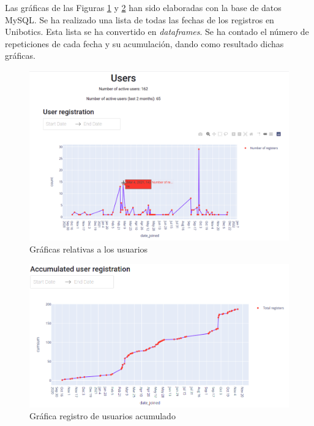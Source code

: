 Las gráficas de las Figuras \ref{fig:users} y \ref{fig:accumulated} han sido elaboradas con la base de datos MySQL. Se ha realizado una lista de todas las fechas de los registros en Unibotics. Esta lista se ha convertido en \textit{dataframes}. Se ha contado el número de repeticiones de cada fecha y su acumulación, dando como resultado dichas gráficas.\\



\begin{figure}[H]
    \centering
    \includegraphics[width=16cm, keepaspectratio]{img/users.png}
    \caption{Gráficas relativas a los usuarios}
    \label{fig:users}
\end{figure}
\begin{figure}[H]
    \centering
    \includegraphics[width=15cm, keepaspectratio]{img/accumulated.png}
    \caption{Gráfica registro de usuarios acumulado}
    \label{fig:accumulated}
\end{figure}
